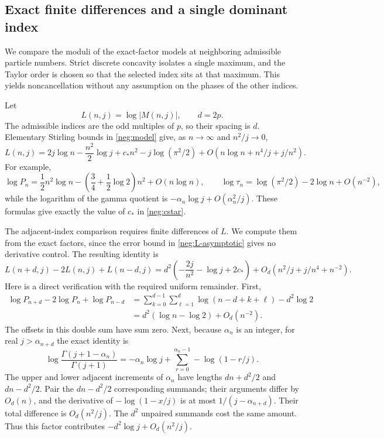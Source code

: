 \documentclass[11pt]{article}
\numberwithin{equation}{section}
\theoremstyle{definition}
\begin{document}
\subsection{Exact finite differences and a single dominant index}
\label{neg:dominance}

We compare the moduli of the exact-factor models at neighboring
admissible particle numbers. Strict discrete concavity isolates a
single maximum, and the Taylor order is chosen so that the selected
index sits at that maximum. This yields noncancellation without any
assumption on the phases of the other indices.

Let
\[
 L(n,j)=\log|M(n,j)|,\qquad d=2p .
 \]
The admissible indices are the odd multiples of \(p\), so their
spacing is \(d\).  Elementary Stirling bounds in
\eqref{neg:model} give, as \(n\to\infty\) and \(n^2/j\to0\),
\begin{equation}
 L(n,j)=2j\log n-\frac{n^2}{2}\log j+c_*n^2
         -j\log(\pi^2/2)
         +O(n\log n+n^4/j+j/n^2).
 \label{neg:L-asymptotic}
\end{equation}
For example,
\[
 \log P_n=\frac12n^2\log n
             -\left(\frac34+\frac12\log2\right)n^2
             +O(n\log n),
 \qquad
 \log\tau_n=\log(\pi^2/2)-2\log n+O(n^{-2}),
 \]
while the logarithm of the gamma quotient is
\(-\alpha_n\log j+O(\alpha_n^2/j)\).
These formulas give exactly the value of \(c_*\) in
\eqref{neg:cstar}.

The adjacent-index comparison requires finite differences of
\(L\). We compute them from the exact factors, since the error
bound in \eqref{neg:L-asymptotic} gives no derivative control.
The resulting identity is
\begin{equation}
 L(n+d,j)-2L(n,j)+L(n-d,j)
 =d^2\left(-\frac{2j}{n^2}-\log j+2c_*\right)
    +O_d(n^2/j+j/n^4+n^{-2}).
 \label{neg:second-difference}
\end{equation}
Here is a direct verification with the required uniform
remainder.  First,
\begin{align}
 \log P_{n+d}-2\log P_n+\log P_{n-d}
 &=\sum_{k=0}^{d-1}\sum_{\ell=1}^{d}
        \log(n-d+k+\ell)-d^2\log2\\
 &=d^2(\log n-\log2)+O_d(n^{-2}).
 \label{neg:P-difference}
\end{align}
The offsets in this double sum have sum zero.
Next, because \(\alpha_n\) is an integer, for real
\(j>\alpha_{n+d}\) the exact identity is
\[
 \log\frac{\Gamma(j+1-\alpha_n)}{\Gamma(j+1)}
 =-\alpha_n\log j+
      \sum_{r=0}^{\alpha_n-1}-\log(1-r/j).
 \]
The upper and lower adjacent increments of \(\alpha_n\)
have lengths \(dn+d^2/2\) and \(dn-d^2/2\).
Pair the \(dn-d^2/2\) corresponding summands; their
arguments differ by \(O_d(n)\), and the derivative of
\(-\log(1-x/j)\) is at most
\(1/(j-\alpha_{n+d})\).
Their total difference is \(O_d(n^2/j)\).
The \(d^2\) unpaired summands cost the same amount.
Thus this factor contributes
\(-d^2\log j+O_d(n^2/j)\).
\end{document}
